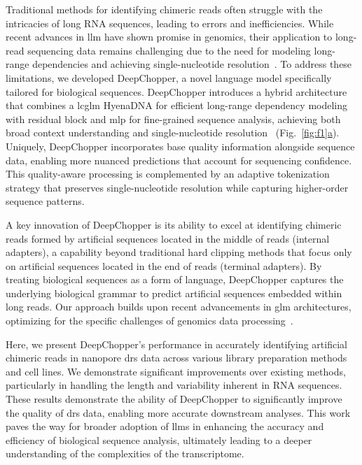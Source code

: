 \documentclass[pdflatex, sn-mathphys-num, lineno]{sn-jnl}%
\newcommand{\figref}[2]{Fig.~\hyperref[#1]{\ref*{#1}#2}}
\theoremstyle{thmstyleone}%
\theoremstyle{thmstyletwo}%
\theoremstyle{thmstylethree}%
\begin{document}
Traditional methods for identifying chimeric reads often struggle with the intricacies of long RNA sequences, leading to errors and inefficiencies.
While recent advances in \gls{llm} have shown promise in genomics, their application to long-read sequencing data remains challenging due to the need for modeling long-range dependencies and achieving single-nucleotide resolution~\cite{dalla2023nucleotide, tay2022efficient, zhou2023dnabert2}.
To address these limitations, we developed DeepChopper, a novel language model specifically tailored for biological sequences.
DeepChopper introduces a hybrid architecture that combines a \gls{lcglm} HyenaDNA for efficient long-range dependency modeling with residual block and \gls{mlp} for fine-grained sequence analysis, achieving both broad context understanding and single-nucleotide resolution~\cite{poli2023hyena, nguyen2024hyenadna, he2016deep} (\figref{fig:f1}{a}).
Uniquely, DeepChopper incorporates base quality information alongside sequence data, enabling more nuanced predictions that account for sequencing confidence.
This quality-aware processing is complemented by an adaptive tokenization strategy that preserves single-nucleotide resolution while capturing higher-order sequence patterns.

A key innovation of DeepChopper is its ability to excel at identifying chimeric reads formed by artificial sequences located in the middle of reads (internal adapters), a capability beyond traditional hard clipping methods that focus only on artificial sequences located in the end of reads (terminal adapters).
By treating biological sequences as a form of language, DeepChopper captures the underlying biological grammar to predict artificial sequences embedded within long reads.
Our approach builds upon recent advancements in \gls{glm} architectures, optimizing for the specific challenges of genomics data processing~\cite{nguyen2024hyenadna}.

Here, we present DeepChopper's performance in accurately identifying artificial chimeric reads in nanopore \gls{drs} data across various library preparation methods and cell lines.
We demonstrate significant improvements over existing methods, particularly in handling the length and variability inherent in RNA sequences.
These results demonstrate the ability of DeepChopper to significantly improve the quality of \gls{drs} data, enabling more accurate downstream analyses.
This work paves the way for broader adoption of \glspl{llm} in enhancing the accuracy and efficiency of biological sequence analysis, ultimately leading to a deeper understanding of the complexities of the transcriptome.
\end{document}
